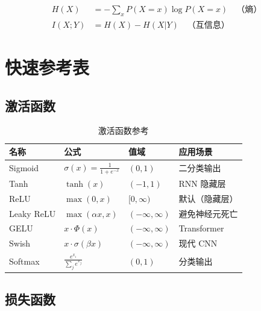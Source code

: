 \begin{align}
H(X) &= -\sum_x P(X=x)\log P(X=x) \quad \text{（熵）} \\
I(X; Y) &= H(X) - H(X|Y) \quad \text{（互信息）}
\end{align}

\chapter{快速参考表}

\section{激活函数}

\begin{table}[ht]
    \centering
    \caption{激活函数参考}
    \begin{tabular}{L{2cm} L{4cm} L{3cm} L{3cm}}
        \toprule
        \textbf{名称} & \textbf{公式} & \textbf{值域} & \textbf{应用场景} \\
        \midrule
        Sigmoid & $\sigma(x) = \frac{1}{1+e^{-x}}$ & $(0, 1)$ & 二分类输出 \\
        Tanh & $\tanh(x)$ & $(-1, 1)$ & RNN 隐藏层 \\
        ReLU & $\max(0, x)$ & $[0, \infty)$ & 默认（隐藏层） \\
        Leaky ReLU & $\max(\alpha x, x)$ & $(-\infty, \infty)$ & 避免神经元死亡 \\
        GELU & $x\cdot\Phi(x)$ & $(-\infty, \infty)$ & Transformer \\
        Swish & $x \cdot \sigma(\beta x)$ & $(-\infty, \infty)$ & 现代 CNN \\
        Softmax & $\frac{e^{x_i}}{\sum_j e^{x_j}}$ & $(0, 1)$ & 分类输出 \\
        \bottomrule
    \end{tabular}
\end{table}

\section{损失函数}

